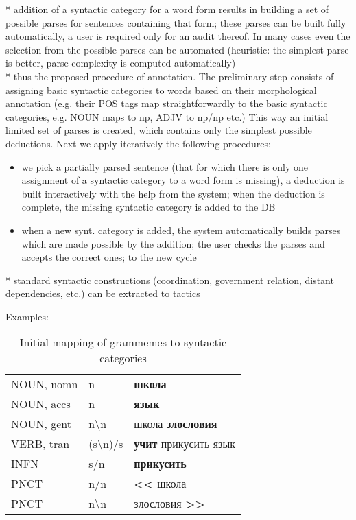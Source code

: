 \documentclass[a4paper]{article}
\theoremstyle{example-style}
\begin{document}
  * addition of a syntactic category for a word form results in building a set of possible parses for sentences containing that form; these parses can be built fully automatically, a user is required only for an audit thereof. In many cases even the selection from the possible parses can be automated (heuristic: the simplest parse is better, parse complexity is computed automatically) \\
  
  * thus the proposed procedure of annotation. The preliminary step consists of assigning basic syntactic categories to words based on their morphological annotation (e.g. their POS tags map straightforwardly to the basic syntactic categories, e.g. NOUN maps to np, ADJV to np/np etc.) This way an initial limited set of parses is created, which contains only the simplest possible deductions. Next we apply iteratively the following procedures:
  \begin{itemize}
  	\item we pick a partially parsed sentence (that for which there is only one assignment of a syntactic category to a word form is missing), a deduction is built interactively with the help from the system; when the deduction is complete, the missing syntactic category is added to the DB
  	\item when a new synt. category is added, the system automatically builds parses which are made possible by the addition; the user checks the parses and accepts the correct ones; to the new cycle
  \end{itemize} 
  
  * standard syntactic constructions (coordination, government relation, distant dependencies, etc.) can be extracted to tactics 
    
Examples:

\begin{table}[ht]
\centering
\caption{Initial mapping of grammemes to syntactic categories}
\label{my-label}
\begin{tabular}{lll}
NOUN, nomn & n         & \textbf{школа}                              \\
NOUN, accs & n         & \textbf{язык}                               \\
NOUN, gent & n\textbackslash n      & школа \textbf{злословия}       \\
VERB, tran & (s\textbackslash n)/s & \textbf{учит} прикусить язык    \\
INFN       & s/n       & \textbf{прикусить}                          \\
PNCT       & n/n       & \textbf{\textless\textless} школа           \\
PNCT       & n\textbackslash n      & злословия \textbf{\textgreater\textgreater} 
\end{tabular}
\end{table}    
    
\end{document}
